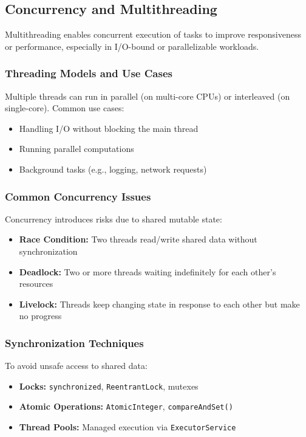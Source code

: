 \documentclass[a4paper,12pt]{article}
\begin{document}
\subsection{Concurrency and Multithreading}

Multithreading enables concurrent execution of tasks to improve responsiveness or performance, especially in I/O-bound or parallelizable workloads.

\subsubsection{Threading Models and Use Cases}

Multiple threads can run in parallel (on multi-core CPUs) or interleaved (on single-core). Common use cases:
\begin{itemize}
  \item Handling I/O without blocking the main thread
  \item Running parallel computations
  \item Background tasks (e.g., logging, network requests)
\end{itemize}

\subsubsection{Common Concurrency Issues}

Concurrency introduces risks due to shared mutable state:
\begin{itemize}
  \item \textbf{Race Condition:} Two threads read/write shared data without synchronization
  \item \textbf{Deadlock:} Two or more threads waiting indefinitely for each other’s resources
  \item \textbf{Livelock:} Threads keep changing state in response to each other but make no progress
\end{itemize}

\subsubsection{Synchronization Techniques}

To avoid unsafe access to shared data:
\begin{itemize}
  \item \textbf{Locks:} \texttt{synchronized}, \texttt{ReentrantLock}, mutexes
  \item \textbf{Atomic Operations:} \texttt{AtomicInteger}, \texttt{compareAndSet()}
  \item \textbf{Thread Pools:} Managed execution via \texttt{ExecutorService}
\end{itemize}
\end{document}
